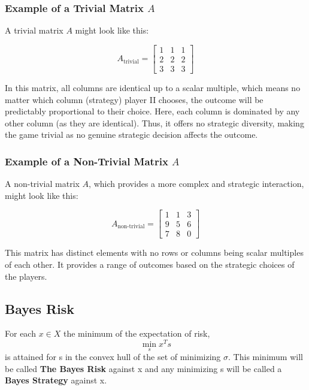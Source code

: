 \documentclass[11pt]{article}
\numberwithin{equation}{section}
\theoremstyle{boldStyle}
\begin{document}
\subsubsection{Example of a Trivial Matrix \( A \)}

A trivial matrix \( A \) might look like this:

\begin{equation*} \label{eq:trivial}
    A_{\text{trivial}} = \begin{bmatrix}
    1 & 1 & 1 \\
    2 & 2 & 2 \\
    3 & 3 & 3
    \end{bmatrix}
\end{equation*}

In this matrix, all columns are identical up to a scalar multiple, which means no matter which column (strategy) player II chooses, the outcome will be predictably proportional to their choice. Here, each column is dominated by any other column (as they are identical). Thus, it offers no strategic diversity, making the game trivial as no genuine strategic decision affects the outcome.

\subsubsection{Example of a Non-Trivial Matrix \( A \)}

A non-trivial matrix \( A \), which provides a more complex and strategic interaction, might look like this:

\begin{equation*} \label{eq:nontrivial}
    A_{\text{non-trivial}} = \begin{bmatrix}
    1 & 1 & 3 \\
    9 & 5 & 6 \\
    7 & 8 & 0
    \end{bmatrix}
\end{equation*}

This matrix has distinct elements with no rows or columns being scalar multiples of each other. It provides a range of outcomes based on the strategic choices of the players. 



\subsection{Bayes Risk}

For each $x \in X$ the minimum of the expectation of risk, 
\[
    \min_{s} x^T s
\]
is attained for s in the convex hull of the set of minimizing $\sigma$. 
This minimum will be called \textbf{The Bayes Risk} against x and any minimizing s will be called a \textbf{Bayes Strategy} against x.
\end{document}

